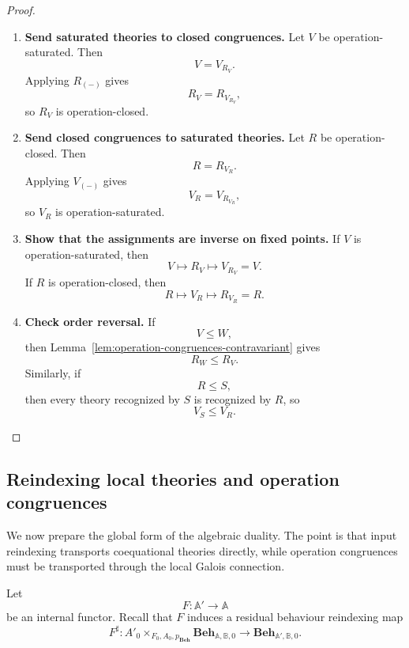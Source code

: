 \begin{proof}
    \leavevmode
    \begin{enumerate}
        \item \textbf{Send saturated theories to closed congruences.}
        Let \(V\) be operation-saturated. Then
        \[
            V=V_{R_V}.
        \]
        Applying \(R_{(-)}\) gives
        \[
            R_V=R_{V_{R_V}},
        \]
        so \(R_V\) is operation-closed.

        \item \textbf{Send closed congruences to saturated theories.}
        Let \(R\) be operation-closed. Then
        \[
            R=R_{V_R}.
        \]
        Applying \(V_{(-)}\) gives
        \[
            V_R=V_{R_{V_R}},
        \]
        so \(V_R\) is operation-saturated.

        \item \textbf{Show that the assignments are inverse on fixed points.}
        If \(V\) is operation-saturated, then
        \[
            V\mapsto R_V\mapsto V_{R_V}=V.
        \]
        If \(R\) is operation-closed, then
        \[
            R\mapsto V_R\mapsto R_{V_R}=R.
        \]

        \item \textbf{Check order reversal.}
        If
        \[
            V\leq W,
        \]
        then Lemma~\ref{lem:operation-congruences-contravariant} gives
        \[
            R_W\leq R_V.
        \]
        Similarly, if
        \[
            R\leq S,
        \]
        then every theory recognized by \(S\) is recognized by \(R\), so
        \[
            V_S\leq V_R.
        \]
    \end{enumerate}
\end{proof}

\subsection{Reindexing local theories and operation congruences}
\label{subsec:reindexing-local-theories-operation-congruences}

We now prepare the global form of the algebraic duality. The point is that
input reindexing transports coequational theories directly, while operation
congruences must be transported through the local Galois connection.

Let
\[
    F:\mathbb A'\to\mathbb A
\]
be an internal functor. Recall that \(F\) induces a residual behaviour
reindexing map
\[
    F^\sharp:
    A'_0\times_{F_0,A_0,p_{\mathbf{Beh}}}
    \mathbf{Beh}_{\mathbb A,\mathbb B,0}
    \to
    \mathbf{Beh}_{\mathbb A',\mathbb B,0}.
\]

